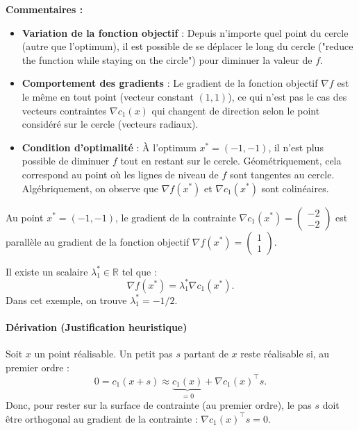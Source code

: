 \begin{figureexplanation}
\textbf{Commentaires :}
\begin{itemize}
    \item \textbf{Variation de la fonction objectif} : Depuis n'importe quel point du cercle (autre que l'optimum), il est possible de se déplacer le long du cercle ("reduce the function while staying on the circle") pour diminuer la valeur de $f$.
    \item \textbf{Comportement des gradients} : Le gradient de la fonction objectif $\nabla f$ est le même en tout point (vecteur constant $(1,1)$), ce qui n'est pas le cas des vecteurs contraintes $\nabla c_1(x)$ qui changent de direction selon le point considéré sur le cercle (vecteurs radiaux).
    \item \textbf{Condition d'optimalité} : À l'optimum $x^*=(-1,-1)$, il n'est plus possible de diminuer $f$ tout en restant sur le cercle. Géométriquement, cela correspond au point où les lignes de niveau de $f$ sont tangentes au cercle. Algébriquement, on observe que $\nabla f(x^*)$ et $\nabla c_1(x^*)$ sont colinéaires.
\end{itemize}
\end{figureexplanation}

\begin{remarque}
Au point $x^* = (-1, -1)$, le gradient de la contrainte $\nabla c_1(x^*) = \begin{pmatrix} -2 \\ -2 \end{pmatrix}$ est parallèle au gradient de la fonction objectif $\nabla f(x^*) = \begin{pmatrix} 1 \\ 1 \end{pmatrix}$.

Il existe un scalaire $\lambda_1^* \in \mathbb{R}$ tel que :
\begin{equation}
    \nabla f(x^*) = \lambda_1^* \nabla c_1(x^*).
\end{equation}
Dans cet exemple, on trouve $\lambda_1^* = -1/2$.
\end{remarque}

\paragraph{Dérivation (Justification heuristique)}
Soit $x$ un point réalisable. Un petit pas $s$ partant de $x$ reste réalisable si, au premier ordre :
\begin{equation}
    0 = c_1(x+s) \approx \underbrace{c_1(x)}_{=0} + \nabla c_1(x)^\top s.
\end{equation}
Donc, pour rester sur la surface de contrainte (au premier ordre), le pas $s$ doit être orthogonal au gradient de la contrainte : $\nabla c_1(x)^\top s = 0$.

